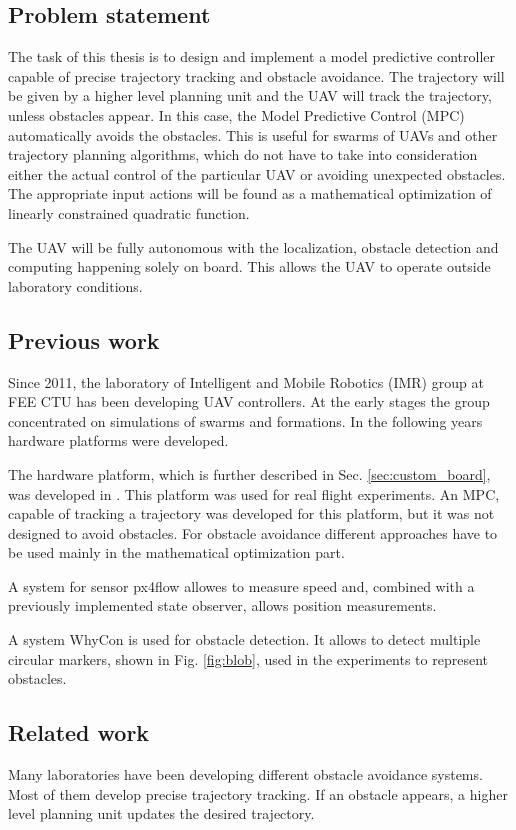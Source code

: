 \documentclass[a4paper,11pt,titlepage]{article}
\begin{document}
\subsection{Problem statement}
The task of this thesis is to design and implement a model predictive controller capable of precise trajectory tracking and obstacle avoidance. The trajectory will be given by a higher level planning unit and the UAV will track the trajectory, unless obstacles appear. In this case, the Model Predictive Control (MPC) automatically avoids the obstacles. This is useful for swarms of UAVs and other trajectory planning algorithms, which do not have to take into consideration either the actual control of the particular UAV or avoiding unexpected obstacles. The appropriate input actions will be found as a mathematical optimization of linearly constrained quadratic function. 

The UAV will be fully autonomous with the localization, obstacle detection and computing happening solely on board. This allows the UAV to operate outside laboratory conditions. 

\subsection{Previous work}
Since 2011, the laboratory of Intelligent and Mobile Robotics (IMR) group at FEE CTU has been developing UAV controllers. At the early stages the group concentrated on simulations of swarms and formations. In the following years hardware platforms were developed. 

The hardware platform, which is further described in Sec. \ref{sec:custom_board}, was developed in \cite{tomas}. This platform was used for real flight experiments. An MPC, capable of tracking a trajectory was developed for this platform, but it was not designed to avoid obstacles. For obstacle avoidance different approaches have to be used mainly in the mathematical optimization part.

A system for sensor px4flow \cite{endrych2014} allowes to measure speed and, combined with a previously implemented state observer\cite{tomas}, allows position measurements. 

A system WhyCon\cite{whycon_icar}\cite{whycon_jint} is used for obstacle detection. It allows to detect multiple circular markers, shown in Fig. \ref{fig:blob}, used in the experiments to represent obstacles.

\subsection{Related work}
Many laboratories have been developing different obstacle avoidance systems. Most of them develop precise trajectory tracking. If an obstacle appears, a higher level planning unit updates the desired trajectory.
\end{document}
